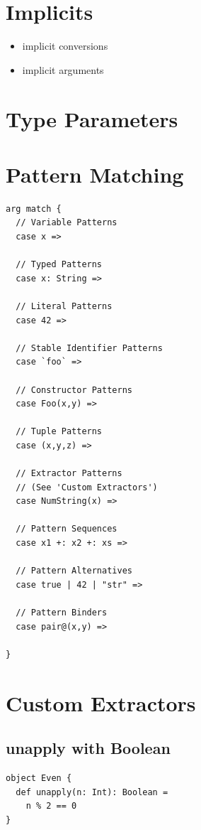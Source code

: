 \documentclass[10pt,landscape,a4paper]{article}
\begin{document}
\begin{multicols*}{4}
\section{Implicits}
\begin{itemize}
\item implicit conversions
\item implicit arguments
\end{itemize}

\section{Type Parameters}

\section{Pattern Matching}
\begin{verbatim}
arg match {
  // Variable Patterns
  case x =>

  // Typed Patterns
  case x: String =>

  // Literal Patterns
  case 42 =>

  // Stable Identifier Patterns
  case `foo` =>

  // Constructor Patterns
  case Foo(x,y) =>

  // Tuple Patterns
  case (x,y,z) =>

  // Extractor Patterns
  // (See 'Custom Extractors')
  case NumString(x) =>

  // Pattern Sequences
  case x1 +: x2 +: xs =>

  // Pattern Alternatives
  case true | 42 | "str" =>

  // Pattern Binders
  case pair@(x,y) =>

}
\end{verbatim}

\section{Custom Extractors}

\subsection{unapply with Boolean}

\begin{verbatim}
object Even {
  def unapply(n: Int): Boolean =
    n % 2 == 0
}
\end{verbatim}


\end{multicols*}
\end{document}
